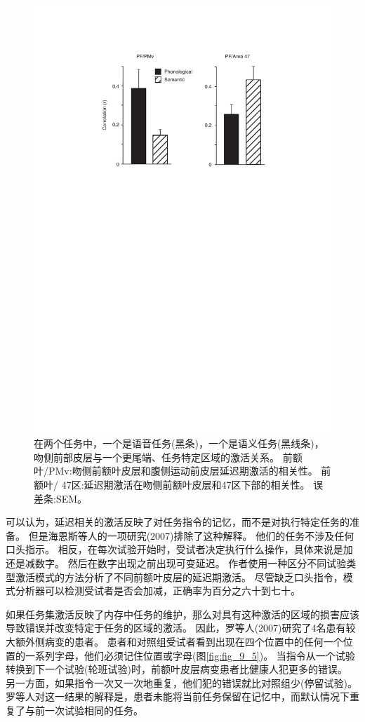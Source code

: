 \begin{figure}[!htb]
	\centering
	\includegraphics[width=0.5\linewidth]{chap9/9_4}
	\caption{在两个任务中，一个是语音任务(黑条)，一个是语义任务(黑线条)，吻侧前部皮层与一个更尾端、任务特定区域的激活关系。
		前额叶/PMv:吻侧前额叶皮层和腹侧运动前皮层延迟期激活的相关性。
		前额叶/ 47区:延迟期激活在吻侧前额叶皮层和47区下部的相关性。
		误差条:SEM\cite{sakai2006prefrontal}。\label{fig:fig_9_4}}
\end{figure}
\par


可以认为，延迟相关的激活反映了对任务指令的记忆，而不是对执行特定任务的准备。
但是海恩斯等人的一项研究(2007)排除了这种解释。
他们的任务不涉及任何口头指示。
相反，在每次试验开始时，受试者决定执行什么操作，具体来说是加还是减数字。
然后在数字出现之前出现可变延迟。
作者使用一种区分不同试验类型激活模式的方法分析了不同前额叶皮层的延迟期激活。
尽管缺乏口头指令，模式分析器可以检测受试者是否会加减，正确率为百分之六十到七十。
\par


如果任务集激活反映了内存中任务的维护，那么对具有这种激活的区域的损害应该导致错误并改变特定于任务的区域的激活。
因此，罗等人(2007)研究了4名患有较大额外侧病变的患者。
患者和对照组受试者看到出现在四个位置中的任何一个位置的一系列字母，他们必须记住位置或字母(图\ref{fig:fig_9_5})。
当指令从一个试验转换到下一个试验(轮班试验)时，前额叶皮层病变患者比健康人犯更多的错误。
另一方面，如果指令一次又一次地重复，他们犯的错误就比对照组少(停留试验)。
罗等人对这一结果的解释是，患者未能将当前任务保留在记忆中，而默认情况下重复了与前一次试验相同的任务。
\par


